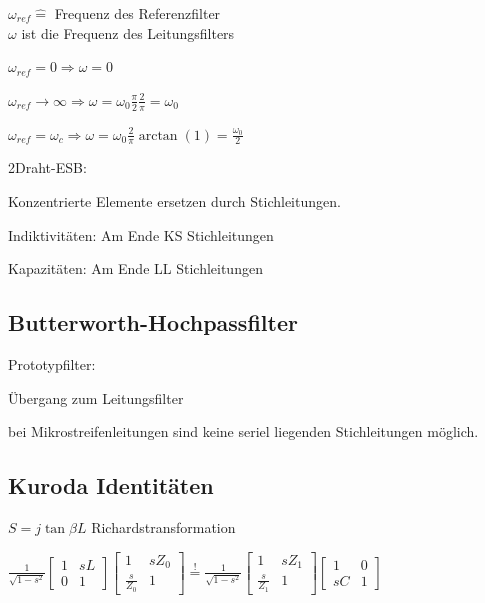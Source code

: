 $\omega_{ref} \hat{=}$ Frequenz des Referenzfilter\\
$\omega$ ist die Frequenz des Leitungsfilters


\begin{pitemize}
\item $\omega_{ref} = 0 \Rightarrow \omega = 0$
\item $\omega_{ref} \rightarrow \infty \Rightarrow \omega = \omega_0 \frac{\pi}{2}\frac{2}{\pi} = \omega_0$
\item $\omega_{ref} = \omega_c \Rightarrow \omega = \omega_0 \frac{2}{\pi} \arctan(1) = \frac{\omega_0}{2}$
\end{pitemize}

2Draht-ESB:\\

Konzentrierte Elemente ersetzen durch Stichleitungen.
\begin{pitemize}
    \item Indiktivitäten: Am Ende KS Stichleitungen 
    \item {}
    \item {}
    \item Kapazitäten: Am Ende LL Stichleitungen
\end{pitemize}


\subsection{Butterworth-Hochpassfilter}
Prototypfilter:



Übergang zum Leitungsfilter

bei Mikrostreifenleitungen sind keine seriel liegenden Stichleitungen möglich.

\subsection{Kuroda Identitäten}


$S = j \tan{\beta L}$ Richardstransformation

$\frac{1}{\sqrt{1 - s^2}}\begin{bmatrix}
    1 & sL \\ 0 & 1
\end{bmatrix} \begin{bmatrix}
    1 & sZ_0 \\ \frac{s}{Z_0} & 1
\end{bmatrix} \overset{!}{=} \frac{1}{\sqrt{1 - s^2}}\begin{bmatrix}
    1 & sZ_1 \\ \frac{s}{Z_1} & 1
\end{bmatrix}\begin{bmatrix}
    1 & 0 \\ sC & 1
\end{bmatrix}$ \\


